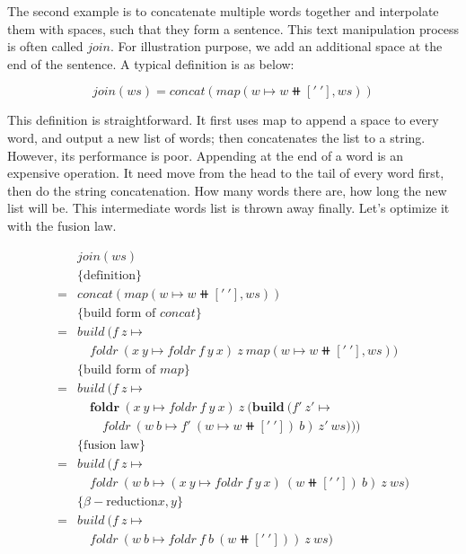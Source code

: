 \documentclass{article}
\begin{document}
\begin{example}
\normalfont
The second example is to concatenate multiple words together and interpolate them with spaces, such that they form a sentence. This text manipulation process is often called $join$. For illustration purpose, we add an additional space at the end of the sentence. A typical definition is as below:

\[
join(ws) = concat(map(w \mapsto w \doubleplus ['\ '], ws))
\]

This definition is straightforward. It first uses map to append a space to every word, and output a new list of words; then concatenates the list to a string. However, its performance is poor. Appending at the end of a word is an expensive operation. It need move from the head to the tail of every word first, then do the string concatenation. How many words there are, how long the new list will be. This intermediate words list is thrown away finally. Let's optimize it with the fusion law.

\[ \begin{array}{rl}
  & join(ws) \\
  & \{\text{definition} \} \\
= & concat(map(w \mapsto w \doubleplus ['\ '], ws)) \\

  & \{\text{build form of } concat\} \\
= & build\ (f\ z \mapsto \\
  & \quad foldr\ (x\ y \mapsto foldr\ f\ y\ x)\ z\ map(w \mapsto w \doubleplus ['\ '], ws)) \\

  & \{\text{build form of } map\} \\
= & build\ (f\ z \mapsto \\
  & \quad \pmb{foldr}\ (x\ y \mapsto foldr\ f\ y\ x)\ z\ (\pmb{build}\ (f'\ z' \mapsto \\
  & \quad \quad foldr\ (w\ b \mapsto f'\ (w \mapsto w \doubleplus ['\ '])\ b)\ z'\ ws))) \\

  & \{\text{fusion law}\} \\
= & build\ (f\ z \mapsto \\
  & \quad foldr\ (w\ b \mapsto (x\ y \mapsto foldr\ f\ y\ x)\ (w \doubleplus ['\ '])\ b)\ z\ ws) \\

  & \{\beta-\text{reduction}x, y\} \\
= & build\ (f\ z \mapsto \\
  & \quad foldr\ (w\ b \mapsto foldr\ f\ b\ (w \doubleplus ['\ ']))\ z\ ws) \\


\end{array}\]
\end{example}
\end{document}
